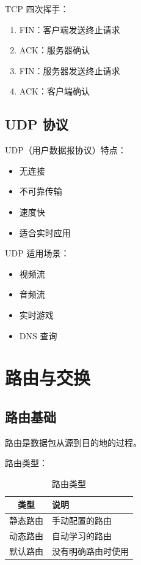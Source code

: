 \documentclass[12pt,UTF8]{ctexbook}
\begin{document}
TCP 四次挥手：
\begin{enumerate}
    \item FIN：客户端发送终止请求
    \item ACK：服务器确认
    \item FIN：服务器发送终止请求
    \item ACK：客户端确认
\end{enumerate}

\section{UDP 协议}
\label{sec:udp}

UDP（用户数据报协议）特点：
\begin{itemize}
    \item 无连接
    \item 不可靠传输
    \item 速度快
    \item 适合实时应用
\end{itemize}

UDP 适用场景：
\begin{itemize}
    \item 视频流
    \item 音频流
    \item 实时游戏
    \item DNS 查询
\end{itemize}

\chapter{路由与交换}
\label{chap:routing}

\section{路由基础}
\label{sec:routing_basics}

路由是数据包从源到目的地的过程。

路由类型：
\begin{table}[htbp]
    \centering
    \caption{路由类型}
    \begin{tabular}{|c|p{8cm}|}
        \hline
        \textbf{类型} & \textbf{说明} \\
        \hline
        静态路由 & 手动配置的路由 \\
        \hline
        动态路由 & 自动学习的路由 \\
        \hline
        默认路由 & 没有明确路由时使用 \\
        \hline
    \end{tabular}
\end{table}
\end{document}
